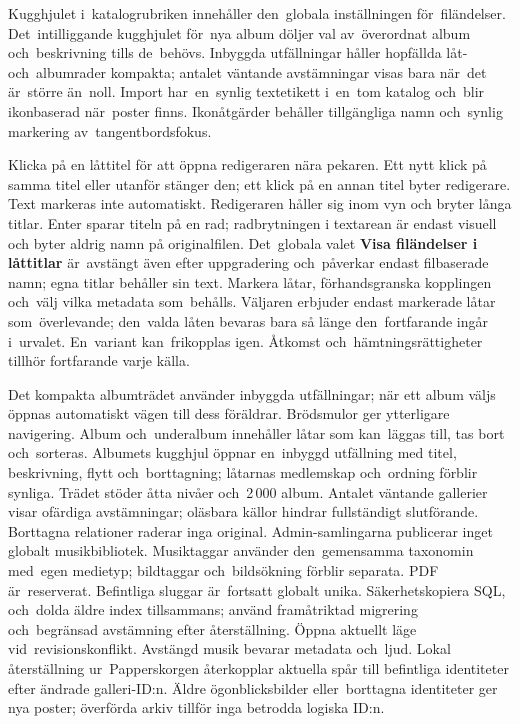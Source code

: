 \documentclass[11pt,a4paper]{article}
\newcommand{\filepath}[1]{\path{#1}}
\newcommand{\ui}[1]{\textbf{#1}}
\begin{document}
Kugghjulet i~katalogrubriken innehåller den~globala inställningen
för~filändelser.
Det~intilliggande kugghjulet för~nya album döljer val av~överordnat album
och~beskrivning
tills de~behövs. Inbyggda utfällningar håller hopfällda låt- och~albumrader
kompakta; antalet väntande avstämningar visas bara när~det är~större än~noll.
Import har~en~synlig textetikett i~en~tom katalog och~blir ikonbaserad
när~poster
finns. Ikonåtgärder behåller tillgängliga namn och~synlig markering
av~tangentbordsfokus.

Klicka på en låttitel för att öppna redigeraren nära pekaren. Ett nytt klick på
samma titel eller utanför stänger den; ett klick på en annan titel byter
redigerare. Text markeras inte automatiskt. Redigeraren håller sig inom vyn och
bryter långa titlar. Enter sparar titeln på en rad; radbrytningen i textarean är
endast visuell och byter aldrig namn på originalfilen. Det~globala valet
\ui{Visa filändelser i låttitlar} är~avstängt även efter uppgradering
och~påverkar endast filbaserade namn; egna titlar behåller sin text.
Markera låtar, förhandsgranska kopplingen och~välj vilka metadata som~behålls.
Väljaren erbjuder endast markerade låtar som~överlevande; den~valda låten
bevaras
bara så länge den~fortfarande ingår i~urvalet. En~variant kan~frikopplas igen.
Åtkomst och~hämtningsrättigheter tillhör
fortfarande varje källa.

Det kompakta albumträdet använder inbyggda utfällningar; när ett album väljs
öppnas automatiskt vägen till dess föräldrar. Brödsmulor ger ytterligare
navigering. Album och~underalbum innehåller låtar som kan~läggas till, tas bort
och~sorteras. Albumets kugghjul öppnar en~inbyggd utfällning med titel,
beskrivning, flytt och~borttagning; låtarnas medlemskap och~ordning förblir
synliga. Trädet stöder åtta nivåer och~2\,000 album. Antalet väntande
gallerier visar ofärdiga avstämningar; oläsbara källor hindrar fullständigt
slutförande.
Borttagna relationer raderar inga original. Admin-samlingarna publicerar inget
globalt
musikbibliotek. Musiktaggar använder den~gemensamma taxonomin med~egen
medietyp; bildtaggar och~bildsökning förblir separata. PDF är~reserverat.
Befintliga sluggar är~fortsatt globalt unika. Säkerhetskopiera SQL,
\filepath{data/music/} och~dolda äldre index tillsammans; använd framåtriktad
migrering och~begränsad avstämning efter
återställning. Öppna aktuellt läge vid~revisionskonflikt. Avstängd musik
bevarar metadata och~ljud.
Lokal återställning ur~Papperskorgen återkopplar aktuella spår till befintliga
identiteter efter ändrade galleri-ID:n. Äldre ögonblicksbilder eller~borttagna
identiteter ger nya poster; överförda arkiv tillför inga betrodda logiska ID:n.
\end{document}
